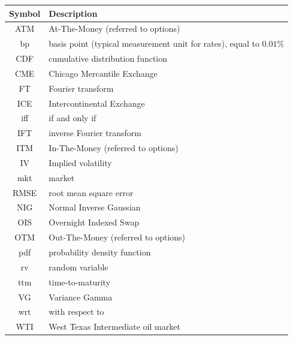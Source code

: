 \documentclass[12pt]{article}
\theoremstyle{definition}
\theoremstyle{remark}
\numberwithin{theorem}{section}
\numberwithin{proposition}{section}
\numberwithin{lemma}{section}
\numberwithin{corollary}{section}
\numberwithin{definition}{section}
\numberwithin{remark}{section}
\numberwithin{example}{section}
\begin{document}
	\begin{tabular}{|c|l|}
		\toprule
		\textbf{Symbol}& \textbf{Description}\\ \bottomrule
		ATM & At-The-Money (referred to options) \\
		bp & basis point (typical measurement unit for rates), equal to $0.01\%$ \\
		CDF & cumulative distribution function \\
		CME & Chicago Mercantile Exchange \\
		FT & Fourier transform \\
		ICE & Intercontinental Exchange \\
		iff & if and only if \\
		IFT & inverse Fourier transform \\
		ITM & In-The-Money (referred to options) \\
		IV & Implied volatility \\
		mkt & market \\
            	RMSE & root mean square error \\
		NIG & Normal Inverse Gaussian \\
		OIS & Overnight Indexed Swap \\
		OTM & Out-The-Money (referred to options) \\		
		pdf & probability density function \\
		rv & random variable \\
         		ttm & time-to-maturity \\
		VG & Variance Gamma \\
		wrt  & with respect to \\
		WTI & West Texas Intermediate oil market \\
		\bottomrule
	\end{tabular}
\end{document}
